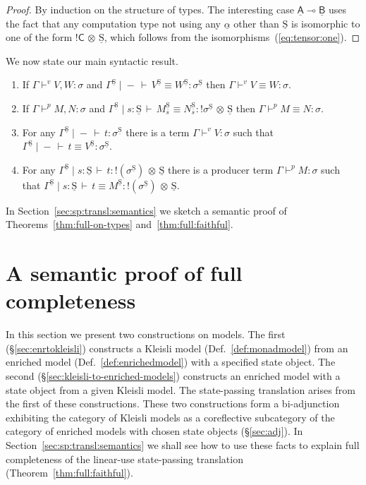 \documentclass{LMCS}
\newcommand{\vj}[3]{#1 \mathrel{\vdash^{v}} #2 \colon \! #3}
\newcommand{\pj}[3]{#1 \mathrel{\vdash^p} #2 \colon \! #3}
\newcommand{\veq}[4]{#1 \mathrel{\vdash^{v}} #2\equiv #3 \colon \! #4}
\newcommand{\peq}[4]{#1 \mathrel{\vdash^p} #2\equiv #3 \colon \! #4}
\newcommand{\STA}{\sigma}
\newcommand{\EECstate}{\underline{\mathrm{S}}}
\newcommand{\svar}s
\newcommand{\comptype}[1]{\underline{#1}}
\newcommand{\co}{\colon}
\newcommand{\CconstA}{\comptype{\alpha}}
\newcommand{\VC}{\mathsf{C}}
\newcommand{\CA}{\comptype{\mathsf{A}}}
\newcommand{\CB}{\comptype{\mathsf{B}}}
\newcommand{\tensor}{\otimes}
\newcommand{\ltensortype}[2]{{!} #1 \, {\tensor} \, #2}
\newcommand{\lfun}{\multimap}
\newcommand{\rIn}[2]{#1 \colon  #2}
\newcommand{\aj}[4]{#1 \mid  \! #2 \, \vdash \, \rIn{#3}{#4}}
\newcommand{\aeq}[5]{#1 \mid  \! #2 \, \vdash \, \rIn{#3\equiv #4}{#5}}
\newcommand{\tj}[3]{\aj{#1}{{-}}{#2}{#3}}
\newcommand{\teq}[4]{\aj{#1}{{-}}{#2\equiv #3}{#4}}
\newcommand{\CBVtoEEC}[1]{#1^{\circ}}
\newcommand{\CBVtoEECbase}[2]{#2^{#1}}
\begin{document}
\begin{proof}
By induction on the structure of types. The interesting case $\CA \lfun \CB$ uses the fact that any computation type not using any $\CconstA$ other than $\EECstate$ is isomorphic to one of the form $\ltensortype{\VC}{\EECstate}$, which follows from the isomorphisms~(\ref{eq:tensor:one}). 
\end{proof}
\noindent
We now state our main syntactic result.
\renewcommand{\CBVtoEEC}{\CBVtoEECbase\EECstate}
\renewcommand{\CBVtoEECV}{\CBVtoEECbase \EECstate}
\renewcommand{\CBVtoEECP}[1]{\CBVtoEECbase \EECstate{#1}_\svar}
\begin{thm} \label{thm:full:faithful}\mbox{}
\begin{enumerate}
\item \label{item:faithful:values} 
If $\vj{\Gamma}{V,W}{\STA}$ 
and $\teq{\CBVtoEEC\Gamma}{\CBVtoEECV{V}}{\CBVtoEECV{W}}{\CBVtoEEC\STA}$ 
then $\veq \Gamma V W\STA$.
\item
If  $\pj{\Gamma}{M,N}{\STA}$ and 
$\aeq{\CBVtoEEC\Gamma}{\svar\co \EECstate}{\CBVtoEECP{M}}{\CBVtoEECP{N}}{\ltensortype{\CBVtoEEC\STA}\EECstate}$ then 
$\peq{\Gamma}MN{\STA}$.
\item For any $\tj{\CBVtoEEC{\Gamma}}{t}{\CBVtoEEC{\STA}}$ there is a term $\vj{\Gamma}{V}{\STA}$ such that $\teq{\CBVtoEEC\Gamma}t{ \CBVtoEEC{V}}{\CBVtoEEC\STA}$. 
\item For any $\aj{\CBVtoEEC{\Gamma}}{s \co \EECstate}{t}{\ltensortype{(\CBVtoEEC{\STA})}{\EECstate}}$ there is a producer term $\pj{\Gamma}{M}{\STA}$ such that 
$\aeq{\CBVtoEEC\Gamma}{s\co\EECstate}t {\CBVtoEEC{M}}{\ltensortype{(\CBVtoEEC{\STA})}{\EECstate}}$.
\end{enumerate}
\end{thm}
\noindent In Section~\ref{sec:sp:transl:semantics} we sketch a semantic proof of Theorems~\ref{thm:full-on-types} and~\ref{thm:full:faithful}.






\section{A semantic proof of full completeness}
\label{sec:relating:models}

In this section we present two constructions on models. The first 
(\S\ref{sec:enrtokleisli})
constructs a Kleisli model (Def.~\ref{def:monadmodel})
from an enriched model (Def.~\ref{def:enrichedmodel})
with a specified
state object.  The second (\S\ref{sec:kleisli-to-enriched-models})
constructs an enriched model with a state
object from a given Kleisli model. The state-passing translation
arises from the first of these constructions. These two constructions
form a bi-adjunction exhibiting the category of Kleisli models as a
coreflective subcategory of the category of enriched models with chosen
state objects (\S\ref{sec:adj}).  
In Section~\ref{sec:sp:transl:semantics} we shall see
how to use these facts to explain full completeness of the 
linear-use state-passing
translation
(Theorem~\ref{thm:full:faithful}).
\end{document}
